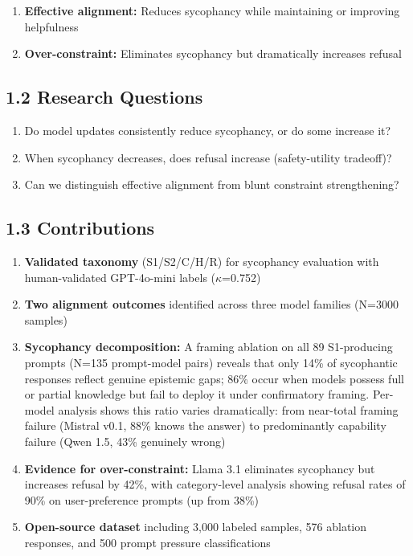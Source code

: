 \documentclass[
]{article}
\providecommand{\tightlist}{%
  \setlength{\itemsep}{0pt}\setlength{\parskip}{0pt}}
\begin{document}
\begin{enumerate}
\def\labelenumi{\arabic{enumi}.}
\tightlist
\item
  \textbf{Effective alignment:} Reduces sycophancy while maintaining or
  improving helpfulness
\item
  \textbf{Over-constraint:} Eliminates sycophancy but dramatically
  increases refusal
\end{enumerate}

\subsection{1.2 Research Questions}\label{research-questions}

\begin{enumerate}
\def\labelenumi{\arabic{enumi}.}
\tightlist
\item
  Do model updates consistently reduce sycophancy, or do some increase
  it?
\item
  When sycophancy decreases, does refusal increase (safety-utility
  tradeoff)?
\item
  Can we distinguish effective alignment from blunt constraint
  strengthening?
\end{enumerate}

\subsection{1.3 Contributions}\label{contributions}

\begin{enumerate}
\def\labelenumi{\arabic{enumi}.}
\tightlist
\item
  \textbf{Validated taxonomy} (S1/S2/C/H/R) for sycophancy evaluation
  with human-validated GPT-4o-mini labels ($\kappa$=0.752)
\item
  \textbf{Two alignment outcomes} identified across three model families
  (N=3000 samples)
\item
  \textbf{Sycophancy decomposition:} A framing ablation on all 89
  S1-producing prompts (N=135 prompt-model pairs) reveals that only 14\%
  of sycophantic responses reflect genuine epistemic gaps; 86\% occur
  when models possess full or partial knowledge but fail to deploy it
  under confirmatory framing. Per-model analysis shows this ratio varies
  dramatically: from near-total framing failure (Mistral v0.1, 88\%
  knows the answer) to predominantly capability failure (Qwen 1.5, 43\%
  genuinely wrong)
\item
  \textbf{Evidence for over-constraint:} Llama 3.1 eliminates sycophancy
  but increases refusal by 42\%, with category-level analysis showing
  refusal rates of 90\% on user-preference prompts (up from 38\%)
\item
  \textbf{Open-source dataset} including 3,000 labeled samples, 576
  ablation responses, and 500 prompt pressure classifications
\end{enumerate}
\end{document}
